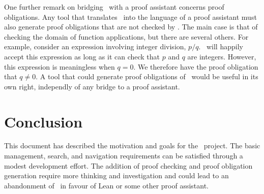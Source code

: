 \documentclass{amsart}
\begin{document}
One further remark on bridging \ZN\ with a proof assistant concerns proof obligations.
Any tool that translates \ZN\ into the language of a proof assistant must also generate proof obligations that are not
checked by \fuzz.
The main case is that of checking the domain of function applications, but there are several others.
For example, consider an expression involving integer division, $p / q$.
\fuzz\ will happily accept this expression as long as it can check that $p$ and $q$ are integers.
However, this expression is meaningless when $q = 0$.
We therefore have the proof obligation that $q \ne 0$.
A tool that could generate proof obligations of \ZN\ would be useful in its own right, independly of any bridge to a proof assistant.

 \section{Conclusion}
 
 This document has described the motivation and goals for the \mathz\ project.
 The basic management, search, and navigation requirements can be satisfied through a modest development effort.
 The addition of proof checking and proof obligation generation require more thinking and investigation and could
 lead to an abandonment of \ZN\ in favour of Lean or some other proof assistant.
 
 \printbibliography
\end{document}
